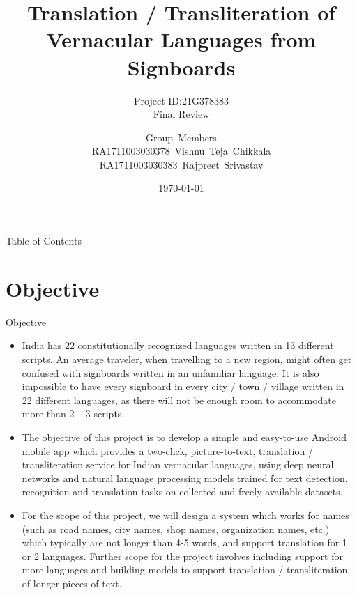 \documentclass{beamer}
\title[21G378383]{Translation / Transliteration of Vernacular Languages from Signboards}
\subtitle{Project ID:21G378383\\Final Review}
\author[SRM Institute of Science \& Technology]{Group~Members\\RA1711003030378~Vishnu~Teja~Chikkala\\RA1711003030383~Rajpreet~Srivastav\\ \medskip{Supervised By:\\Mr.~Sunil~Kumar\\Assistant~Professor}}
\institute[]{Department of Computer Science \& Engineering\\Faculty of Engineering \& Technology\\SRM Institute of Science \& Technology}
\date{\today}
\begin{document}
	\begin{frame}
		\maketitle
		\date{}
	\end{frame}
	\begin{frame}[allowframebreaks]{Table of Contents} %
		\tableofcontents[sections={1-5}]
		\framebreak
		\tableofcontents[sections={6-10}]
	\end{frame}
	
\section{Objective}
\begin{frame}[allowframebreaks]{Objective}
\begin{itemize}
	\item India has 22 constitutionally recognized languages written in 13 different scripts. An average traveler, when travelling to a new region, might often get confused with signboards written in an unfamiliar language. It is also impossible to have every signboard in every city / town / village written in 22 different languages, as there will not be enough room to accommodate more than 2 – 3 scripts.
	\item The objective of this project is to develop a simple and easy-to-use Android mobile app which provides a two-click, picture-to-text, translation / transliteration service for Indian vernacular languages, using deep neural networks and natural language processing models trained for text detection, recognition and translation tasks on collected and freely-available datasets.
	\item For the scope of this project, we will design a system which works for names (such as road names, city names, shop names, organization names, etc.) which typically are not longer than 4-5 words, and support translation for 1 or 2 languages. Further scope for the project involves including support for more languages and building models to support translation / transliteration of longer pieces of text.
\end{itemize}
\end{frame}
\end{document}
